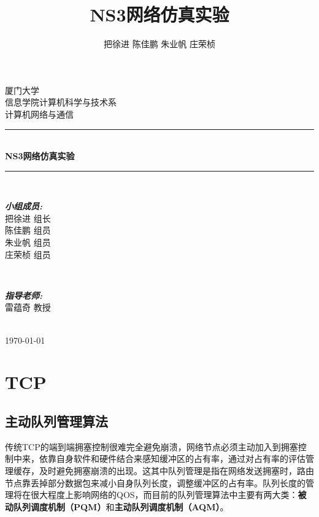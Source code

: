 \documentclass{article}
\title{\heiti NS3网络仿真实验}
\author{\kaishu 把徐进 陈佳鹏 朱业帆 庄荣桢}
\date{}
\begin{document}
 
	
\begin{titlepage}
	
	\newcommand{\HRule}{\rule{\linewidth}{0.5mm}} %
	
	\center %
	
	\textsc{\LARGE 厦门大学}\\[1.5cm]
	\textsc{\Large 信息学院计算机科学与技术系}\\[0.5cm]
	\textsc{\large 计算机网络与通信}\\[0.5cm]
	
	\HRule \\[0.4cm]
	{ \huge \bfseries NS3网络仿真实验}\\[0.4cm] %
	\HRule \\[1.5cm]
	
	\begin{minipage}{0.5\textwidth}
		\begin{flushleft} \large
			\emph{\textbf{小组成员:}}\\
			把徐进 \textsc{组长} \\
			陈佳鹏 \textsc{组员} \\
			朱业帆 \textsc{组员} \\
			庄荣桢 \textsc{组员} \\
		\end{flushleft}
	\end{minipage}
	~
	\begin{minipage}{0.4\textwidth}
		\begin{flushright} \large
			\emph{\textbf{指导老师:}} \\
			雷蕴奇 \textsc{教授}
		\end{flushright}
	\end{minipage}\\[2cm]
	
	{\large \today}\\[2cm]
	
	\vfill %
	
\end{titlepage}


\newpage
\tableofcontents
\newpage
\section{TCP}
\subsection{主动队列管理算法}
传统TCP的端到端拥塞控制很难完全避免崩溃，网络节点必须主动加入到拥塞控制中来，依靠自身软件和硬件结合来感知缓冲区的占有率，通过对占有率的评估管理缓存，及时避免拥塞崩溃的出现。这其中队列管理是指在网络发送拥塞时，路由节点靠丢掉部分数据包来减小自身队列长度，调整缓冲区的占有率。队列长度的管理将在很大程度上影响网络的QOS，而目前的队列管理算法中主要有两大类：\textbf{被动队列调度机制（PQM）}和\textbf{主动队列调度机制（AQM）}。
\end{document}

